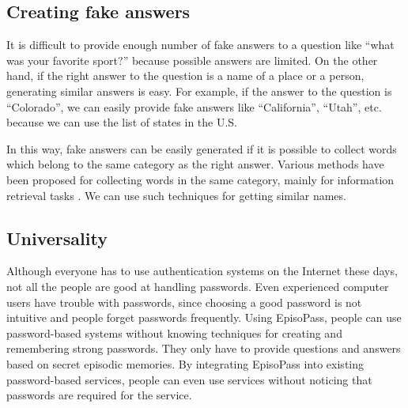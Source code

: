 \documentclass[runningheads,a4paper]{llncs}
\begin{document}
\subsection{Creating fake answers}


It is difficult to provide enough number of fake answers to a question like
``what was your favorite sport?''
because possible answers are limited.
%
%
%
On the other hand, if the right answer to the question is a name of a place or a person,
generating similar answers is easy.
For example, if the answer to the question is ``Colorado'',
we can easily provide fake answers like ``California'', ``Utah'', etc.
because we can use the list of states in the U.S.

In this way, fake answers can be easily generated
if it is possible to collect words which belong to the same
category as the right answer.
%
Various methods have been proposed for collecting words in the
same category, mainly for information retrieval tasks%
\cite{Huang:2012:LFC:2426725.2426728}%
\cite{BooWa}%
\cite{Wang:2007:LSE:1441428.1442086}.%
We can use such techniques for getting similar names.

\subsection{Universality}

Although everyone has to use authentication systems on the Internet these days,
not all the people are good at handling passwords.
Even experienced computer users have trouble with passwords,
since choosing a good password is not intuitive and
people forget passwords frequently.
%
Using EpisoPass, people can use password-based systems without knowing
techniques for creating and remembering strong passwords.
They only have to provide
questions and answers based on secret episodic memories.
%
By integrating EpisoPass into existing password-based services,
people can even use services without noticing that passwords are
required for the service.
\end{document}
